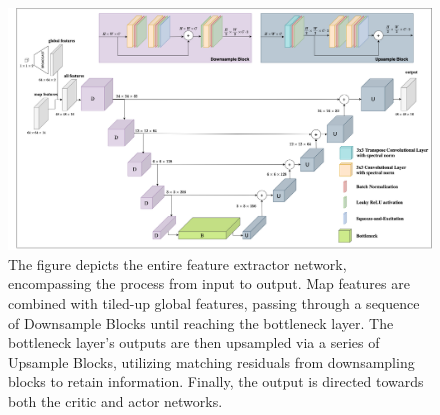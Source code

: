 \begin{figure}[htbp]
    \centering
    \includegraphics[width=1\linewidth]{images/methods_mono/feature_extractor/unet.png}
    \captionsetup{justification=justified, singlelinecheck=false, width=1\linewidth, labelfont=bf} 
    \caption[]{The figure depicts the entire feature extractor network, encompassing the process from input to output. Map features are combined with tiled-up global features, passing through a sequence of Downsample Blocks until reaching the bottleneck layer. The bottleneck layer's outputs are then upsampled via a series of Upsample Blocks, utilizing matching residuals from downsampling blocks to retain information. Finally, the output is directed towards both the critic and actor networks.}
    \label{fig:BottleNet}
\end{figure}

